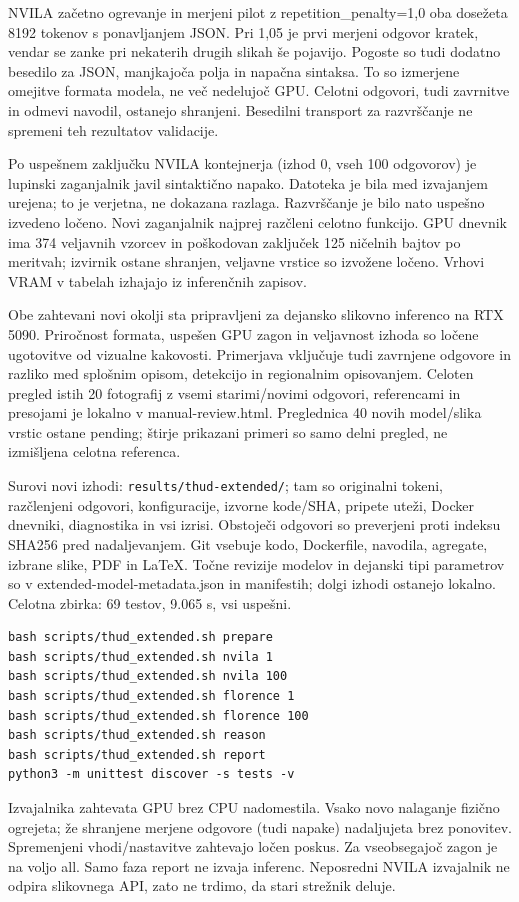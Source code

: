\documentclass[10pt,a4paper]{article}
\begin{document}
NVILA začetno ogrevanje in merjeni pilot z repetition\_penalty=1,0 oba dosežeta 8192 tokenov s ponavljanjem JSON. Pri 1,05 je prvi merjeni odgovor kratek, vendar se zanke pri nekaterih drugih slikah še pojavijo. Pogoste so tudi dodatno besedilo za JSON, manjkajoča polja in napačna sintaksa. To so izmerjene omejitve formata modela, ne več nedelujoč GPU. Celotni odgovori, tudi zavrnitve in odmevi navodil, ostanejo shranjeni. Besedilni transport za razvrščanje ne spremeni teh rezultatov validacije.

Po uspešnem zaključku NVILA kontejnerja (izhod 0, vseh 100 odgovorov) je lupinski zaganjalnik javil sintaktično napako. Datoteka je bila med izvajanjem urejena; to je verjetna, ne dokazana razlaga. Razvrščanje je bilo nato uspešno izvedeno ločeno. Novi zaganjalnik najprej razčleni celotno funkcijo. GPU dnevnik ima 374 veljavnih vzorcev in poškodovan zaključek 125 ničelnih bajtov po meritvah; izvirnik ostane shranjen, veljavne vrstice so izvožene ločeno. Vrhovi VRAM v tabelah izhajajo iz inferenčnih zapisov.

Obe zahtevani novi okolji sta pripravljeni za dejansko slikovno inferenco na RTX 5090. Priročnost formata, uspešen GPU zagon in veljavnost izhoda so ločene ugotovitve od vizualne kakovosti. Primerjava vključuje tudi zavrnjene odgovore in razliko med splošnim opisom, detekcijo in regionalnim opisovanjem. Celoten pregled istih 20 fotografij z vsemi starimi/novimi odgovori, referencami in presojami je lokalno v manual-review.html. Preglednica 40 novih model/slika vrstic ostane pending; štirje prikazani primeri so samo delni pregled, ne izmišljena celotna referenca.

Surovi novi izhodi: \texttt{results/thud-extended/}; tam so originalni tokeni, razčlenjeni odgovori, konfiguracije, izvorne kode/SHA, pripete uteži, Docker dnevniki, diagnostika in vsi izrisi. Obstoječi odgovori so preverjeni proti indeksu SHA256 pred nadaljevanjem. Git vsebuje kodo, Dockerfile, navodila, agregate, izbrane slike, PDF in LaTeX. Točne revizije modelov in dejanski tipi parametrov so v extended-model-metadata.json in manifestih; dolgi izhodi ostanejo lokalno.
Celotna zbirka: 69 testov, 9.065 s, vsi uspešni.
\begin{verbatim}
bash scripts/thud_extended.sh prepare
bash scripts/thud_extended.sh nvila 1
bash scripts/thud_extended.sh nvila 100
bash scripts/thud_extended.sh florence 1
bash scripts/thud_extended.sh florence 100
bash scripts/thud_extended.sh reason
bash scripts/thud_extended.sh report
python3 -m unittest discover -s tests -v
\end{verbatim}
Izvajalnika zahtevata GPU brez CPU nadomestila. Vsako novo nalaganje fizično ogrejeta; že shranjene merjene odgovore (tudi napake) nadaljujeta brez ponovitev. Spremenjeni vhodi/nastavitve zahtevajo ločen poskus. Za vseobsegajoč zagon je na voljo all. Samo faza report ne izvaja inferenc. Neposredni NVILA izvajalnik ne odpira slikovnega API, zato ne trdimo, da stari strežnik deluje.
\end{document}
